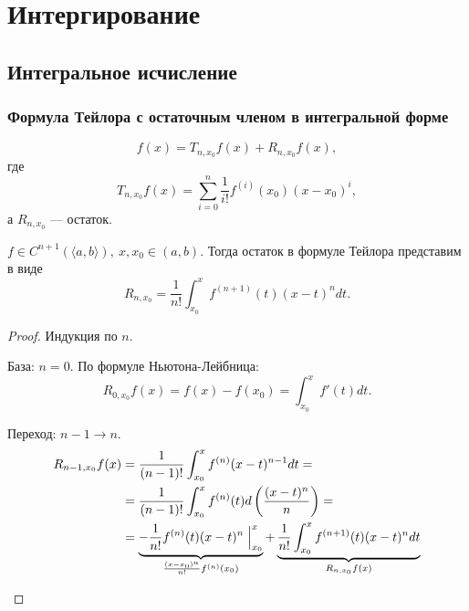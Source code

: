 % 
% 

\chapter{Интергирование}
\section{Интегральное исчисление}

\subsection{Формула Тейлора с остаточным членом в интегральной форме}
\[
    f(x)  = T_{n, x_0} f(x) + R_{n, x_0} f(x) 
,\] 
где 
\[
    T_{n, x_0} f(x) = \sum_{i=0}^{n} \frac{1}{i!} f^{(i)}(x_0) (x-x_0)^{i}
,\] 
а $ R_{n, x_0}$ --- остаток.
\begin{thm}
    $ f \in  C^{n+1} (\langle a, b \rangle), ~ x, x_0 \in  (a, b)$. Тогда остаток в формуле Тейлора представим в виде
    \[
	R_{n, x_0} =\frac{1}{n!} \int_{x_0}^{x} f^{(n+1)}(t) (x-t)^{n} dt 
    .\] 
\end{thm}
\begin{proof}
    Индукция по $n$.
    $ $
    \begin{description}
        \item База: $ n=0$. 
	    По формуле Ньютона-Лейбница:
	    \[
		R_{0, x_0} f(x) = f(x) - f(x_0) = \int_{x_0}^{x} f'(t) dt 
	    .\] 
        \item Переход: $ n-1 \to n$. 
	    \begin{align*}
		R_{n-1, x_0} f(x) &= \frac{1}{(n-1)!} \int_{x_0}^{x} f^{(n)}(x-t)^{n-1}dt = \\
				  & = \frac{1}{(n-1)!} \int_{x_0}^{x}  f^{(n)}(t) d \left( \frac{(x-t)^{n}}{n} \right)  = \\
				  & = \underbrace{-\frac{1}{n!} f^{(n)}(t)(x-t)^{n} \Bigm |_{x_0}^{x}}_{\frac{(x-x_0)^{n}}{n!} f^{(n)}(x_0)} + \underbrace{\frac{1}{n!}  \int_{x_0}^{x} f^{(n+1)}(t) (x-t)^{n}dt}_{R_{n, x_0}f(x)}
	    \end{align*}
    \end{description} 
\end{proof}
